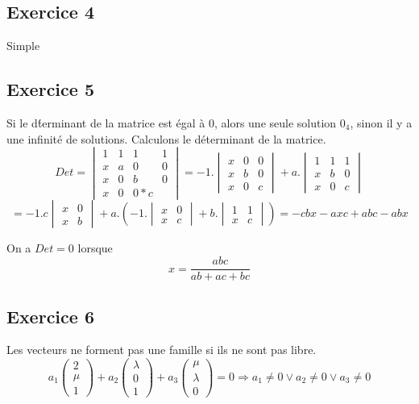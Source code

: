 \documentclass[]{book}
\theoremstyle{definition}
\begin{document}
\subsection*{Exercice 4}
Simple

\subsection*{Exercice 5}
Si le d\'terminant de la matrice est \'egal \`a 0, alors une seule solution $0_4$, sinon il y a une infinit\'e de solutions. Calculons le d\'eterminant de la matrice.
$$
Det = \begin{vmatrix} 1 & 1 & 1 & 1 \\ x & a & 0 & 0 \\ x & 0 & b & 0 \\ x & 0 & 0 * c\end{vmatrix} = 
-1.\begin{vmatrix}  x & 0 & 0 \\ x & b & 0 \\ x & 0 & c \end{vmatrix} + a.\begin{vmatrix}  1 & 1 & 1 \\ x & b & 0 \\ x & 0 & c \end{vmatrix}
$$
$$
= -1.c\begin{vmatrix}  x & 0 \\ x & b \end{vmatrix} + a.\left(-1.\begin{vmatrix}  x & 0 \\ x & c \end{vmatrix} + b.\begin{vmatrix}  1 & 1 \\ x & c \end{vmatrix}\right) =
-cbx - axc + abc -abx
$$

On a $Det=0$ lorsque
$$
x = \frac{abc}{ab+ac+bc}
$$

\subsection*{Exercice 6}
Les vecteurs ne forment pas une famille si ils ne sont pas libre.
$$
a_1\begin{pmatrix}2\\\mu\\1\end{pmatrix} + a_2\begin{pmatrix}\lambda \\ 0 \\1 \end{pmatrix} + a_3\begin{pmatrix}\mu\\\lambda\\0\end{pmatrix} = 0
\Rightarrow a_1 \neq 0 \lor a_2 \neq 0 \lor a_3 \neq 0$$
\end{document}
